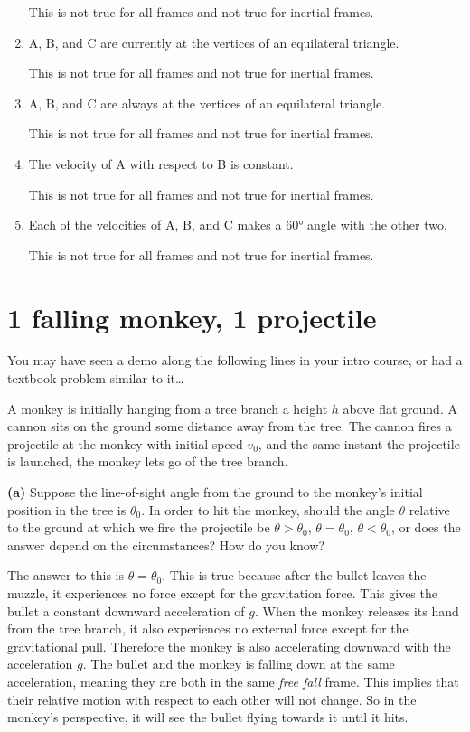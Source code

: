 \documentclass[12pt]{article}
\begin{document}
\begin{enumerate}
    This is not true for all frames and not true for inertial frames.

    \item A, B, and C are currently at the vertices of an equilateral triangle.
    
    This is not true for all frames and not true for inertial frames.


    \item A, B, and C are always at the vertices of an equilateral triangle.
    
    This is not true for all frames and not true for inertial frames.

    \item The velocity of A with respect to B is constant.

    This is not true for all frames and not true for inertial frames.

    \item Each of the velocities of A, B, and C makes a 60° angle with the other two.

    This is not true for all frames and not true for inertial frames.

\end{enumerate}

\section{1 falling monkey, 1 projectile}

You may have seen a demo along the following lines in your intro course, or had a textbook problem similar to it…

A monkey is initially hanging from a tree branch a height \(h\) above flat ground. A cannon sits on the ground some distance away from the tree. The cannon fires a projectile at the monkey with initial speed \(v_0\), and the same instant the projectile is launched, the monkey lets go of the tree branch.

\textbf{(a)} Suppose the line-of-sight angle from the ground to the monkey’s initial position in the tree is \(\theta_0\). In order to hit the monkey, should the angle \(\theta\) relative to the ground at which we fire the projectile be \(\theta > \theta_0\), \(\theta = \theta_0\), \(\theta < \theta_0\), or does the answer depend on the circumstances? How do you know?

The answer to this is $\theta = \theta_0$. This is true because after the bullet leaves the muzzle, it experiences no force except for the gravitation force. This gives the bullet a constant downward acceleration of $g$. When the monkey releases its hand from the tree branch, it also experiences no external force except for the gravitational pull. Therefore the monkey is also accelerating downward with the acceleration $g$. The bullet and the monkey is falling down at the same acceleration, meaning they are both in the same \textit{free fall} frame. This implies that their relative motion with respect to each other will not change. So in the monkey's perspective, it will see the bullet flying towards it until it hits. 
\end{document}
